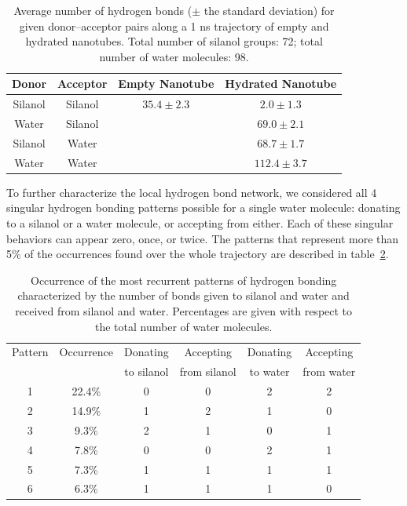 \documentclass[thesis]{subfiles}
\begin{document}
\begin{table}[t]
    \centering
    \caption{Average number of hydrogen bonds ($\pm$ the standard deviation)
    for given donor--acceptor pairs along a 1 ns trajectory of empty and
    hydrated nanotubes. Total number of silanol groups: 72; total number of
    water molecules: 98.}
    \label{tab:imogolite:hbonds:count}
    \begin{tabular}{c c c c}
        \toprule
        Donor   & Acceptor & Empty Nanotube  & Hydrated Nanotube \\
        \midrule
        Silanol & Silanol  & $35.4 \pm 2.3$  & $2.0  \pm 1.3$    \\
        Water   & Silanol  &                 & $69.0 \pm 2.1$    \\
        Silanol & Water    &                 & $68.7 \pm 1.7$    \\
        Water   & Water    &                 & $112.4 \pm 3.7$   \\
        \bottomrule
    \end{tabular}
\end{table}

To further characterize the local hydrogen bond network, we considered all 4
singular hydrogen bonding patterns possible for a single water molecule:
donating to a silanol or a water molecule, or accepting from either. Each of
these singular behaviors can appear zero, once, or twice. The patterns that
represent more than {5\%} of the occurrences found over the whole trajectory are
described in table~\ref{tab:imogolite:hbonds:patterns}.

\begin{table}[ht]
    \centering
    \caption{Occurrence of the most recurrent patterns of hydrogen bonding
    characterized by the number of bonds given to silanol and water and received
    from silanol and water. Percentages are given with respect to the total
    number of water molecules.}
    \label{tab:imogolite:hbonds:patterns}
    \begin{tabular}{c c c c c c}
        \toprule
        Pattern & Occurrence & Donating   & Accepting    & Donating & Accepting  \\
                &            & to silanol & from silanol & to water & from water \\
        \midrule
            1   & 22.4\%     &      0     &      0       &    2     &     2      \\
            2   & 14.9\%     &      1     &      2       &    1     &     0      \\
            3   & 9.3\%      &      2     &      1       &    0     &     1      \\
            4   & 7.8\%      &      0     &      0       &    2     &     1      \\
            5   & 7.3\%      &      1     &      1       &    1     &     1      \\
            6   & 6.3\%      &      1     &      1       &    1     &     0      \\
        \bottomrule
    \end{tabular}
\end{table}
\end{document}
